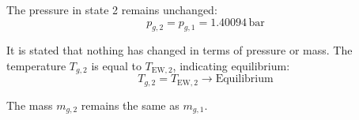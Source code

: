 The pressure in state 2 remains unchanged:  
\[
p_{g,2} = p_{g,1} = 1.40094 \, \text{bar}
\]  

It is stated that nothing has changed in terms of pressure or mass. The temperature \( T_{g,2} \) is equal to \( T_{\text{EW},2} \), indicating equilibrium:  
\[
T_{g,2} = T_{\text{EW},2} \rightarrow \text{Equilibrium}
\]  

The mass \( m_{g,2} \) remains the same as \( m_{g,1} \).